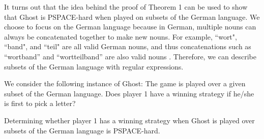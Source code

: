 \documentclass[runningheads,a4paper]{llncs}
\begin{document}
It turns out that the idea behind the proof of Theorem 1 can be used to show that Ghost is PSPACE-hard when played on subsets of the German language. We choose to focus on the German language because in German, multiple nouns can always be concatenated together to make new nouns. For example, ``wort", ``band", and ``teil" are all valid German nouns, and thus concatenations such as “wortband” and “wortteilband” are also valid nouns \cite{german}. Therefore, we can describe subsets of the German language with regular expressions.

We consider the following instance of Ghost: The game is played over a given subset of the German language. Does player 1 have a winning strategy if he/she is first to pick a letter?

\begin{theorem}Determining whether player 1 has a winning strategy when Ghost is played over subsets of the German language is PSPACE-hard.
\end{theorem}
\end{document}
